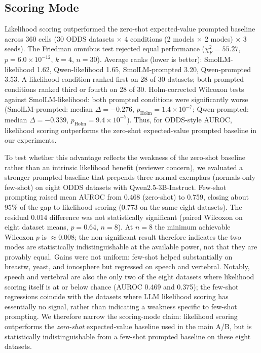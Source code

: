\documentclass[conference]{IEEEtran}
\begin{document}
\subsection{Scoring Mode}\label{subsec:scoringmode}
Likelihood scoring outperformed the zero-shot expected-value prompted baseline across 360 cells (30 ODDS datasets $\times$ 4 conditions (2 models $\times$ 2 modes) $\times$ 3 seeds).
The Friedman omnibus test rejected equal performance ($\chi^2_F=55.27$, $p=6.0\times10^{-12}$, $k=4$, $n=30$).
Average ranks (lower is better): SmolLM-likelihood 1.62, Qwen-likelihood 1.65, SmolLM-prompted 3.20, Qwen-prompted 3.53.
A likelihood condition ranked first on 28 of 30 datasets; both prompted conditions ranked third or fourth on 28 of 30.
Holm-corrected Wilcoxon tests against SmolLM-likelihood: both prompted conditions were significantly worse (SmolLM-prompted: median $\Delta=-0.276$, $p_{\mathrm{Holm}}=1.4\times10^{-7}$; Qwen-prompted: median $\Delta=-0.339$, $p_{\mathrm{Holm}}=9.4\times10^{-7}$).
Thus, for ODDS-style AUROC, likelihood scoring outperforms the zero-shot expected-value prompted baseline in our experiments.

To test whether this advantage reflects the weakness of the zero-shot baseline rather than an intrinsic likelihood benefit (reviewer concern), we evaluated a stronger prompted baseline that prepends three normal exemplars (normals-only few-shot) on eight ODDS datasets with Qwen2.5-3B-Instruct.
Few-shot prompting raised mean AUROC from 0.468 (zero-shot) to 0.759, closing about 95\% of the gap to likelihood scoring (0.773 on the same eight datasets).
The residual 0.014 difference was not statistically significant (paired Wilcoxon on eight dataset means, $p=0.64$, $n=8$). At $n=8$ the minimum achievable Wilcoxon $p$ is ${\approx}0.008$; the non-significant result therefore indicates the two modes are statistically indistinguishable at the available power, not that they are provably equal.
Gains were not uniform: few-shot helped substantially on breastw, yeast, and ionosphere but regressed on speech and vertebral.
Notably, speech and vertebral are also the only two of the eight datasets where likelihood scoring itself is at or below chance (AUROC 0.469 and 0.375); the few-shot regressions coincide with the datasets where LLM likelihood scoring has essentially no signal, rather than indicating a weakness specific to few-shot prompting.
We therefore narrow the scoring-mode claim: likelihood scoring outperforms the \emph{zero-shot} expected-value baseline used in the main A/B, but is statistically indistinguishable from a few-shot prompted baseline on these eight datasets.
\end{document}
